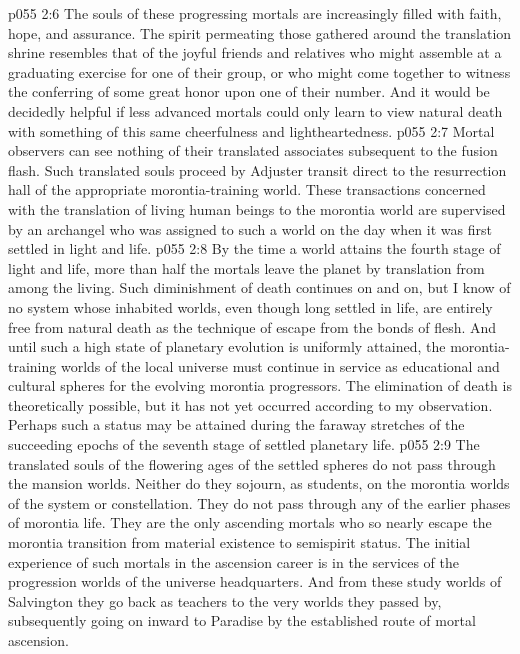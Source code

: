 \vs p055 2:6 The souls of these progressing mortals are increasingly filled with faith, hope, and assurance. The spirit permeating those gathered around the translation shrine resembles that of the joyful friends and relatives who might assemble at a graduating exercise for one of their group, or who might come together to witness the conferring of some great honor upon one of their number. And it would be decidedly helpful if less advanced mortals could only learn to view natural death with something of this same cheerfulness and lightheartedness.
\pc \vs p055 2:7 Mortal observers can see nothing of their translated associates subsequent to the fusion flash. Such translated souls proceed by Adjuster transit direct to the resurrection hall of the appropriate morontia\hyp{}training world. These transactions concerned with the translation of living human beings to the morontia world are supervised by an archangel who was assigned to such a world on the day when it was first settled in light and life.
\vs p055 2:8 By the time a world attains the fourth stage of light and life, more than half the mortals leave the planet by translation from among the living. Such diminishment of death continues on and on, but I know of no system whose inhabited worlds, even though long settled in life, are entirely free from natural death as the technique of escape from the bonds of flesh. And until such a high state of planetary evolution is uniformly attained, the morontia\hyp{}training worlds of the local universe must continue in service as educational and cultural spheres for the evolving morontia progressors. The elimination of death is theoretically possible, but it has not yet occurred according to my observation. Perhaps such a status may be attained during the faraway stretches of the succeeding epochs of the seventh stage of settled planetary life.
\pc \vs p055 2:9 The translated souls of the flowering ages of the settled spheres do not pass through the mansion worlds. Neither do they sojourn, as students, on the morontia worlds of the system or constellation. They do not pass through any of the earlier phases of morontia life. They are the only ascending mortals who so nearly escape the morontia transition from material existence to semispirit status. The initial experience of such  mortals in the ascension career is in the services of the progression worlds of the universe headquarters. And from these study worlds of Salvington they go back as teachers to the very worlds they passed by, subsequently going on inward to Paradise by the established route of mortal ascension.
